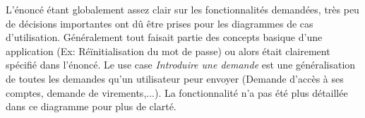 L'énoncé étant globalement assez clair sur les fonctionnalités demandées, 
très peu de décisions importantes ont dû être prises pour les diagrammes de cas d'utilisation.
Généralement tout faisait partie des concepts basique d'une application (Ex: Réïnitialisation du mot de passe) ou alors était clairement spécifié dans l'énoncé.
Le use case \textit{Introduire une demande} est une généralisation de toutes les demandes qu'un utilisateur peur envoyer (Demande d'accès à ses comptes, demande de virements,...). 
La fonctionnalité n'a pas été plus détaillée dans ce diagramme pour plus de clarté.
